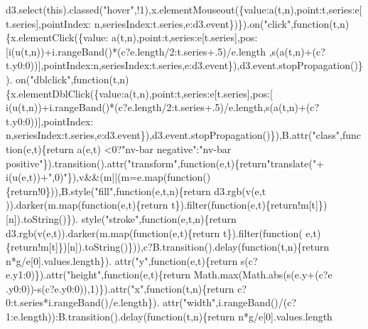 \begin{DoxyCode}
{      d3.select(\textcolor{keyword}{this}).classed(\textcolor{stringliteral}{"hover"},!1),x.elementMouseout(\{value:a(t,n),point:t,series:e[t.series],pointIndex:
      n,seriesIndex:t.series,e:d3.event\})\}).on(\textcolor{stringliteral}{"click"},\textcolor{keyword}{function}(t,n)\{x.elementClick(\{value:
      a(t,n),point:t,series:e[t.series],pos:[i(u(t,n))+i.rangeBand()*(c?e.length/2:t.series+.5)/e.length
,s(a(t,n)+(c?t.y0:0))],pointIndex:n,seriesIndex:t.series,e:d3.event\}),d3.event.stopPropagation()\}).
      on(\textcolor{stringliteral}{"dblclick"},\textcolor{keyword}{function}(t,n)\{x.elementDblClick(\{value:a(t,n),point:t,series:e[t.series],pos:[
      i(u(t,n))+i.rangeBand()*(c?e.length/2:t.series+.5)/e.length,s(a(t,n)+(c?t.y0:0))],pointIndex:
      n,seriesIndex:t.series,e:d3.event\}),d3.event.stopPropagation()\}),B.attr(\textcolor{stringliteral}{"class"},\textcolor{keyword}{function}(e,t)\{return a(e,t)
      <0?\textcolor{stringliteral}{"nv-bar negative"}:\textcolor{stringliteral}{"nv-bar positive"}\}).transition().attr(\textcolor{stringliteral}{"transform"},\textcolor{keyword}{function}(e,t)\{\textcolor{keywordflow}{return}\textcolor{stringliteral}{"translate("}+
      i(u(e,t))+\textcolor{stringliteral}{",0)"}\}),v&&(m||(m=e.map(\textcolor{keyword}{function}()\{return!0\})),B.style(\textcolor{stringliteral}{"fill"},\textcolor{keyword}{function}(e,t,n)\{return d3.rgb(v(e,t
      )).darker(m.map(function(e,t)\{return t\}).filter(\textcolor{keyword}{function}(e,t)\{\textcolor{keywordflow}{return}!m[t]\})[n]).toString()\}).
      style(\textcolor{stringliteral}{"stroke"},\textcolor{keyword}{function}(e,t,n)\{\textcolor{keywordflow}{return} d3.rgb(v(e,t)).darker(m.map(\textcolor{keyword}{function}(e,t)\{return t\}).filter(\textcolor{keyword}{function}(
      e,t)\{\textcolor{keywordflow}{return}!m[t]\})[n]).toString()\})),c?B.transition().delay(\textcolor{keyword}{function}(t,n)\{\textcolor{keywordflow}{return} n*g/e[0].values.length\}).
      attr(\textcolor{stringliteral}{"y"},\textcolor{keyword}{function}(e,t)\{\textcolor{keywordflow}{return} s(c?e.y1:0)\}).attr(\textcolor{stringliteral}{"height"},\textcolor{keyword}{function}(e,t)\{\textcolor{keywordflow}{return} Math.max(Math.abs(s(e.y+(c?e
      .y0:0))-s(c?e.y0:0)),1)\}).attr(\textcolor{stringliteral}{"x"},\textcolor{keyword}{function}(t,n)\{\textcolor{keywordflow}{return} c?0:t.series*i.rangeBand()/e.length\}).
      attr(\textcolor{stringliteral}{"width"},i.rangeBand()/(c?1:e.length)):B.transition().delay(\textcolor{keyword}{function}(t,n)\{\textcolor{keywordflow}{return} n*g/e[0].values.length
}
\end{DoxyCode}
